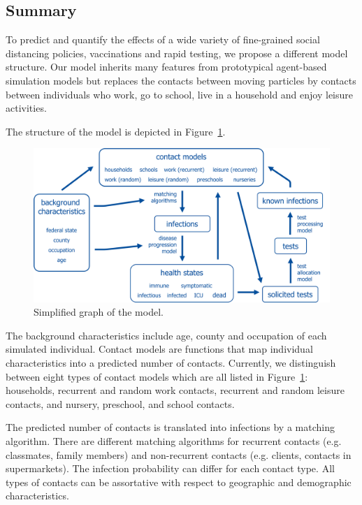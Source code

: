 \subsection{Summary}
\label{sub:model_summary}

To predict and quantify the effects of a wide variety of fine-grained social distancing
policies, vaccinations and rapid testing, we propose a different model structure. Our
model inherits many features from prototypical agent-based simulation models but
replaces the contacts between moving particles by contacts between individuals who work,
go to school, live in a household and enjoy leisure activities.

The structure of the model is depicted in Figure~\ref{fig:model_graph}.

\begin{figure}[!tp]
    \centering
    \includegraphics[width=\textwidth]{../figures/model_detailed.png}
    \caption{Simplified graph of the model.}
    \label{fig:model_graph}
\end{figure}

The background characteristics include age, county and occupation of each simulated
individual. Contact models are functions that map individual characteristics into a
predicted number of contacts. Currently, we distinguish between eight types of contact
models which are all listed in Figure~\ref{fig:model_graph}: households, recurrent and
random work contacts, recurrent and random leisure contacts, and nursery, preschool, and
school contacts.

The predicted number of contacts is translated into infections by a matching algorithm.
There are different matching algorithms for recurrent contacts (e.g. classmates, family
members) and non-recurrent contacts (e.g. clients, contacts in supermarkets). The
infection probability can differ for each contact type. All types of contacts can be
assortative with respect to geographic and demographic characteristics.

